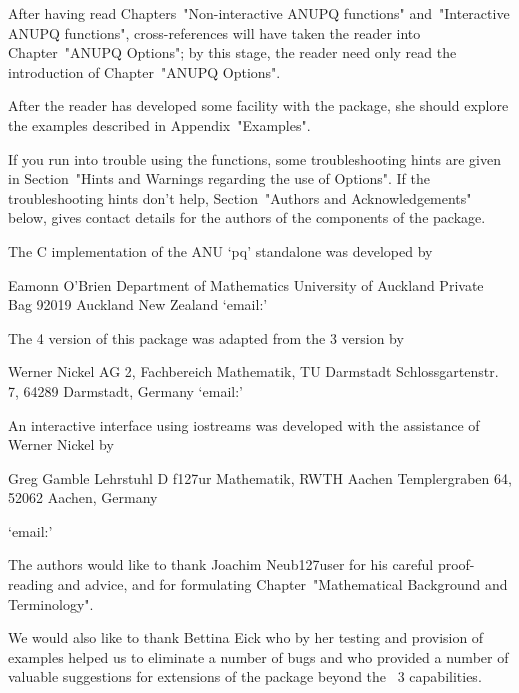 After   having   read    Chapters~"Non-interactive    ANUPQ    functions"
and~"Interactive ANUPQ functions", cross-references will have  taken  the
reader into Chapter~"ANUPQ Options"; by this stage, the reader need  only
read the introduction of Chapter~"ANUPQ Options".

After the reader has developed some facility with the  {\ANUPQ}  package,
she should explore the examples described in Appendix~"Examples".

If  you  run  into   trouble   using   the   {\ANUPQ}   functions,   some
troubleshooting hints are given in Section~"Hints and Warnings  regarding
the  use  of  Options".  If  the  troubleshooting   hints   don't   help,
Section~"Authors and Acknowledgements" below, gives contact  details  for
the authors of the components of the {\ANUPQ} package.


The C implementation of the ANU `pq' standalone was developed by

\begintt
Eamonn O'Brien
Department of Mathematics
University of Auckland
Private Bag 92019
Auckland
New Zealand
\endtt
{}`email:' 

The {\GAP} 4 version of this package was adapted from the {\GAP} 3
version by  

\begintt
Werner Nickel
AG 2, Fachbereich Mathematik, TU Darmstadt
Schlossgartenstr. 7, 64289 Darmstadt, Germany
\endtt
{}`email:' 

An  interactive  interface  using  iostreams  was  developed   with   the
assistance of Werner Nickel by

{}Greg Gamble
Lehrstuhl D f\accent127ur Mathematik, RWTH Aachen
Templergraben 64, 52062 Aachen, Germany

{}`email:'  

The authors would  like  to  thank  Joachim  Neub\accent127user  for  his
careful    proof-reading    and    advice,    and     for     formulating
Chapter~"Mathematical Background and Terminology".

We would also like to thank Bettina Eick who by her testing and provision
of examples helped us to eliminate a number of bugs and  who  provided  a
number of valuable suggestions for extensions of the package  beyond  the
{\GAP}~3 capabilities. 


